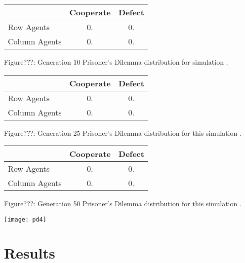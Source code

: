 \documentclass{article}
\begin{document}
\begin{center}
\begin{tabular}{|l|c|c|}
\hline
& Cooperate & Defect \\ 
\hline
Row Agents & 0. & 0.\\
\hline
Column Agents & 0. & 0.\\
\hline
\end{tabular}
\end{center}
\begin{center}
Figure???: Generation 10 Prisoner’s Dilemma distribution for simulation .
\end{center}

\begin{center}
\begin{tabular}{|l|c|c|}
\hline
& Cooperate & Defect \\ 
\hline
Row Agents & 0. & 0.\\
\hline
Column Agents & 0. & 0.\\
\hline
\end{tabular}
\end{center}
\begin{center}
Figure???: Generation 25 Prisoner’s Dilemma distribution for this simulation .
\end{center}


\begin{center}
\begin{tabular}{|l|c|c|}
\hline
& Cooperate & Defect \\ 
\hline
Row Agents & 0. & 0.\\
\hline
Column Agents & 0. & 0.\\
\hline
\end{tabular}
\end{center}
\begin{center}
Figure???: Generation 50 Prisoner’s Dilemma distribution for this simulation .
\end{center}

\begin{center}
	\texttt{[image: pd4]}
\end{center}



\section{Results}

\newpage


\end{document}
